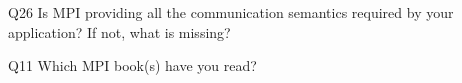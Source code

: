 \begin{description}%
\item{Q26} Is MPI providing all the communication semantics required by your application? If not, what is missing?%
\item{Q11} Which MPI book(s) have you read?%
\end{description}%
